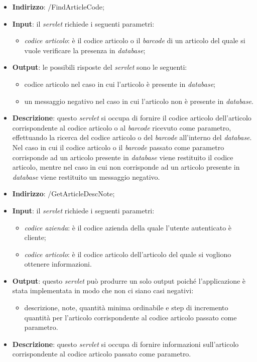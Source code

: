 \begin{itemize}
	\item \textbf{Indirizzo}: /FindArticleCode;
	\item \textbf{Input}: il \textit{servlet} richiede i seguenti parametri:
		\begin{itemize}
			\item \textit{codice articolo}: è il codice articolo o il \textit{barcode} di un articolo del quale si vuole verificare la presenza in \textit{database};
		\end{itemize}
	\item \textbf{Output}: le possibili risposte del \textit{servlet} sono le seguenti:
		\begin{itemize}
			\item codice articolo nel caso in cui l'articolo è presente in \textit{database};
			\item un messaggio negativo nel caso in cui l'articolo non è presente in \textit{database}.
		\end{itemize}
	\item \textbf{Descrizione}: questo \textit{servlet} si occupa di fornire il codice articolo dell'articolo corrispondente al codice articolo o al \textit{barcode} ricevuto come parametro, effettuando la ricerca del codice articolo o del \textit{barcode} all'interno del \textit{database}. Nel caso in cui il codice articolo o il \textit{barcode} passato come parametro corrisponde ad un articolo presente in \textit{database} viene restituito il codice articolo, mentre nel caso in cui non corrisponde ad un articolo presente in \textit{database} viene restituito un messaggio negativo.
\end{itemize}


\begin{itemize}
	\item \textbf{Indirizzo}: /GetArticleDescNote;
	\item \textbf{Input}: il \textit{servlet} richiede i seguenti parametri:
		\begin{itemize}
			\item \textit{codice azienda}: è il codice azienda della quale l'utente autenticato è cliente;
			\item \textit{codice articolo}: è il codice articolo dell'articolo del quale si vogliono ottenere informazioni.
		\end{itemize}
	\item \textbf{Output}: questo \textit{servlet} può produrre un solo output poiché l'applicazione è stata implementata in modo che non ci siano casi negativi:
		\begin{itemize}
			\item descrizione, note, quantità minima ordinabile e step di incremento quantità per l'articolo corrispondente al codice articolo passato come parametro.
		\end{itemize}
	\item \textbf{Descrizione}: questo \textit{servlet} si occupa di fornire informazioni sull'articolo corrispondente al codice articolo passato come parametro. 
\end{itemize}

